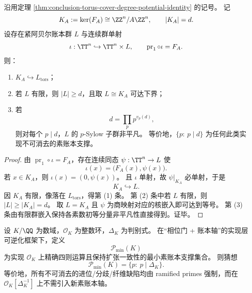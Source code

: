 \begin{theorem}[覆盖核的最小素账本签名]\label{thm:conclusion-cover-kernel-min-prime-ledger-signature}
沿用定理 \ref{thm:conclusion-torus-cover-degree-potential-identity} 的记号。
记
\[
K_A:=\ker(F_A)\cong \ZZ^n/A\ZZ^n,\qquad |K_A|=d.
\]
设存在紧阿贝尔账本群 \(L\) 与连续群单射
\[
\iota:\TT^n\hookrightarrow \TT^n\times L,\qquad
\operatorname{pr}_1\circ \iota=F_A.
\]
则：
\begin{enumerate}
  \item \(K_A\hookrightarrow L_{\mathrm{tors}}\)；
  \item 若 \(L\) 有限，则 \(|L|\ge d\)，且取 \(L\cong K_A\) 可达下界；
  \item 若
  \[
  d=\prod_{p}p^{v_p(d)},
  \]
  则对每个 \(p\mid d\)，\(L\) 的 \(p\)-Sylow 子群非平凡。
  等价地，\(\{p:\ p\mid d\}\) 为任何此类实现不可消去的素账本支撑。
\end{enumerate}
\end{theorem}
\begin{proof}
由 \(\operatorname{pr}_1\circ\iota=F_A\)，存在连续同态 \(\psi:\TT^n\to L\) 使
\[
\iota(x)=\bigl(F_A(x),\psi(x)\bigr).
\]
若 \(x\in K_A\)，则 \(\iota(x)=(0,\psi(x))\)。
且 \(\iota\) 单射，故 \(\psi|_{K_A}\) 必单射，于是
\[
K_A\hookrightarrow L.
\]
因 \(K_A\) 有限，像落在 \(L_{\mathrm{tors}}\)，得第 (1) 条。
第 (2) 条中若 \(L\) 有限，则 \(|L|\ge |K_A|=d\)。
取 \(L=K_A\) 且 \(\psi\) 为商映射对应的核嵌入即可达到等号。
第 (3) 条由有限群嵌入保持各素数初等分量非平凡性直接得到。证毕。
\end{proof}

\begin{conjecture}[判别式支撑的最小素账本原则]\label{conj:conclusion-discriminant-supported-min-prime-ledger}
设 \(K/\QQ\) 为数域，\(\mathcal O_K\) 为整数环，\(\Delta_K\) 为判别式。
在“相位门 + 账本轴”的实现层可逆化框架下，定义
\[
\mathcal P_{\min}(K)
\]
为实现 \(\mathcal O_K\) 上精确四则运算且保持扩张一致性的最小素账本支撑集合。
则猜想
\[
\mathcal P_{\min}(K)=\{p:\ p\mid \Delta_K\}.
\]
等价地，所有不可消去的进位/分歧/纤维缺陷均由 ramified primes 强制，而在 \(\mathcal O_K[\Delta_K^{-1}]\) 上不需引入新素账本轴。
\end{conjecture}

